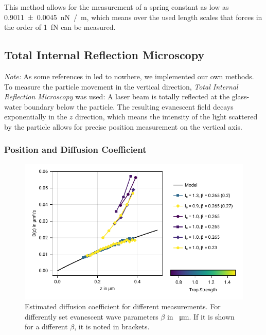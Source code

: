 \documentclass[
    twoside=false,
    twocolumn=true,
    fontsize=11pt,
]{scrarticle}
\begin{document}
This method allows for the measurement of a spring constant as low as \SI{0.9011(45)}{\nano N /m}, which means over the used length scales that forces in the order of \SI{1}{\femto N} can be measured.

\subsection{Total Internal Reflection Microscopy}
\textit{Note:} As some references in \cite{instructions} led to nowhere, we implemented our own methods.\\
To measure the particle movement in the vertical direction, \textit{Total Internal Reflection Microscopy} was used: A laser beam is totally reflected at the glass-water boundary below the particle. The resulting evanescent field decays exponentially in the $z$ direction, which means the intensity of the light scattered by the particle allows for precise position measurement on the vertical axis.


\subsubsection*{Position and Diffusion Coefficient}
\begin{figure}
    \centering
    \includegraphics{figures/02_04_01_diffusion.pdf}
    \caption{Estimated diffusion coefficient for different measurements. For differently set evanescent wave parameters $\beta$ in \SI{}{\micro m}. If it is shown for a different $\beta$, it is noted in brackets.}
\end{figure}
\end{document}
